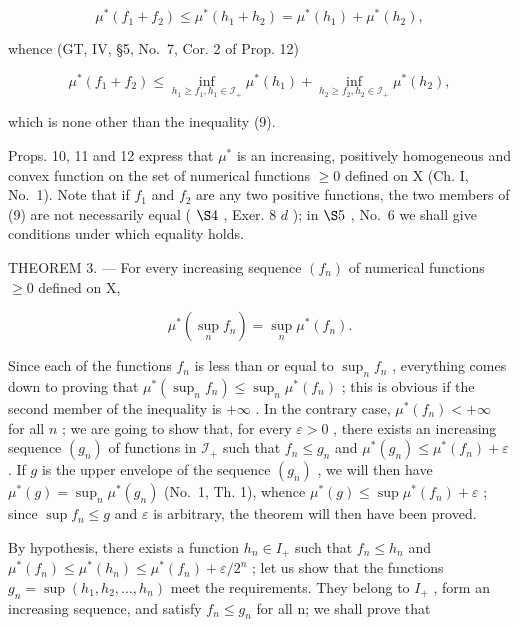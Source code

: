 \[
\mu^ {*} (f _ {1} + f _ {2}) \leqslant \mu^ {*} (h _ {1} + h _ {2}) = \mu^ {*} (h _ {1}) + \mu^ {*} (h _ {2}),
\]

whence (GT, IV, §5, No.~7, Cor. 2 of Prop. 12)

\[
\mu^ {*} (f _ {1} + f _ {2}) \leqslant \inf _ {h _ {1} \geqslant f _ {1}, h _ {1} \in \mathcal {I} _ {+}} \mu^ {*} (h _ {1}) + \inf _ {h _ {2} \geqslant f _ {2}, h _ {2} \in \mathcal {I} _ {+}} \mu^ {*} (h _ {2}),
\]

which is none other than the inequality (9).

Props. 10, 11 and 12 express that \(\mu^{*}\) is an increasing, positively homogeneous and convex function on the set of numerical functions \(\geqslant 0\) defined on X (Ch. I, No.~1). Note that if \(f_{1}\) and \(f_{2}\) are any two positive functions, the two members of (9) are not necessarily equal ( \(\S 4\) , Exer. 8 \(d\) ); in \(\S 5\) , No.~6 we shall give conditions under which equality holds.

THEOREM 3. --- For every increasing sequence \((f_{n})\) of numerical functions \(\geqslant 0\) defined on X,

\[
\mu^ {*} \left(\sup _ {n} f _ {n}\right) = \sup _ {n} \mu^ {*} (f _ {n}).\tag{10}
\]

Since each of the functions \(f_n\) is less than or equal to \(\sup_{n} f_n\) , everything comes down to proving that \(\mu^*(\sup_{n} f_n) \leqslant \sup_{n} \mu^*(f_n)\) ; this is obvious if the second member of the inequality is \(+\infty\) . In the contrary case, \(\mu^*(f_n) < +\infty\) for all \(n\) ; we are going to show that, for every \(\varepsilon > 0\) , there exists an increasing sequence \((g_n)\) of functions in \(\mathcal{I}_+\) such that \(f_n \leqslant g_n\) and \(\mu^*(g_n) \leqslant \mu^*(f_n) + \varepsilon\) . If \(g\) is the upper envelope of the sequence \((g_n)\) , we will then have \(\mu^*(g) = \sup_n \mu^*(g_n)\) (No.~1, Th. 1), whence \(\mu^*(g) \leqslant \sup \mu^*(f_n) + \varepsilon\) ; since \(\sup f_n \leqslant g\) and \(\varepsilon\) is arbitrary, the theorem will then have been proved.

By hypothesis, there exists a function \(h_{n} \in I_{+}\) such that \(f_{n} \leqslant h_{n}\) and \(\mu^{*}(f_{n}) \leqslant \mu^{*}(h_{n}) \leqslant \mu^{*}(f_{n}) + \varepsilon/2^{n}\) ; let us show that the functions \(g_{n} = \sup(h_{1}, h_{2}, \ldots, h_{n})\) meet the requirements. They belong to \(I_{+}\) , form an increasing sequence, and satisfy \(f_{n} \leqslant g_{n}\) for all n; we shall prove that

